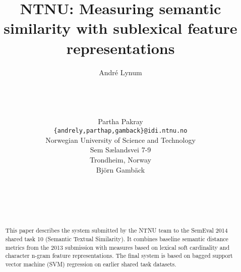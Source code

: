\documentclass[11pt]{article}
\title{NTNU: Measuring semantic similarity with sublexical feature representations}
\author{Andr\'{e} Lynum \\
  \\
  \\
  \\
  \\
  \And
  Partha Pakray \\
  {\tt \{andrely,parthap,gamback\}@idi.ntnu.no} \\
  Norwegian University of Science and Technology \\
  Sem S{\ae}landsvei 7-9 \\
  Trondheim, Norway \\
  \And
  Bj\"{o}rn Gamb\"{a}ck \\
  \\
  \\
  \\
  \\
}
\date{}
\begin{document}
\maketitle
\begin{abstract}
  This paper describes the system submitted by the NTNU team to the SemEval 2014 shared task 10 (Semantic Textual Similarity). It combines baseline semantic distance metrics from the 2013 submission with measures based on lexical soft cardinality and character n-gram feature representations. The final system is based on bagged support vector machine (SVM) regression on earlier shared task datasets.
\end{abstract}















\end{document}
